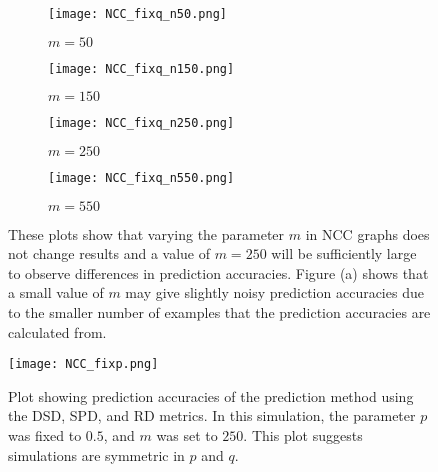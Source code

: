 \begin{figure}[H]
\begin{subfigure}[h]{0.5\linewidth}
\texttt{[image: NCC\_fixq\_n50.png]}
\caption{$m = 50$}
\end{subfigure}
\hfill
\begin{subfigure}[h]{0.5\linewidth}
\texttt{[image: NCC\_fixq\_n150.png]}
\caption{$m = 150$}
\end{subfigure}
\hfill
\begin{subfigure}[h]{0.5\linewidth}
\texttt{[image: NCC\_fixq\_n250.png]}
\caption{$m = 250$}
\end{subfigure}
\hfill
\begin{subfigure}[h]{0.5\linewidth}
\texttt{[image: NCC\_fixq\_n550.png]}
\caption{$m = 550$}
\end{subfigure}%
\caption{These plots show that varying the parameter $m$ in NCC graphs does not change results and a
  value of $m=250$ will be sufficiently large to observe differences in prediction accuracies.
  Figure (a) shows that a small value of $m$ may give slightly noisy prediction accuracies due to
  the smaller number of examples that the prediction accuracies are calculated from.}
\label{fig:NCC_n}
\end{figure}

\begin{figure}[H]
\centering
\texttt{[image: NCC\_fixp.png]}
\caption{Plot showing prediction accuracies of the prediction method using the DSD, SPD, and RD
  metrics. In this simulation, the parameter $p$ was fixed to $0.5$, and $m$ was set to $250$. This
  plot suggests simulations are symmetric in $p$ and $q$.}
\label{fig:NCC_fixp}
\end{figure}


